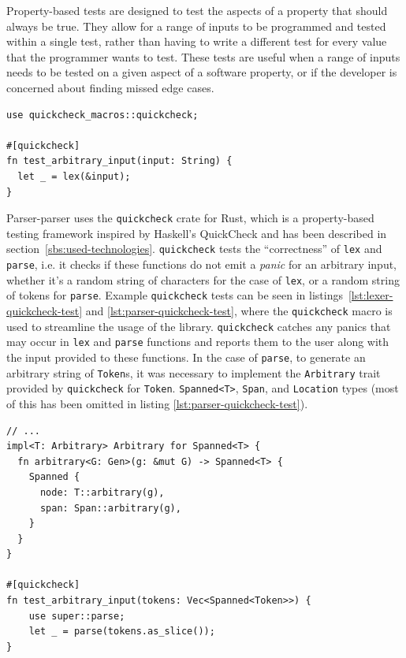 \documentclass[english,engineering]{wizthesis}
\newcommand{\thisproject}{Parser-parser}
\begin{document}
Property-based tests are designed to test the aspects of a property that should
always be true. They allow for a range of inputs to be programmed and tested
within a single test, rather than having to write a different test for every
value that the programmer wants to test. These tests are useful when a range of
inputs needs to be tested on a given aspect of a software property, or if the
developer is concerned about finding missed edge cases.

\begin{listing}[H]
  \begin{verbatim}
use quickcheck_macros::quickcheck;

#[quickcheck]
fn test_arbitrary_input(input: String) {
  let _ = lex(&input);
}
  \end{verbatim}
  \caption{A QuickCheck test testing arbitrary inputs on the lexer.}
  \label{lst:lexer-quickcheck-test}
\end{listing}

\thisproject{} uses the \texttt{quickcheck} crate for Rust, which is a
property-based testing framework inspired by Haskell's QuickCheck and has been
described in section~\ref{sbs:used-technologies}. \texttt{quickcheck} tests the
``correctness'' of \texttt{lex} and \texttt{parse}, i.e. it checks if these
functions do not emit a \emph{panic} for an arbitrary input, whether it's a
random string of characters for the case of \texttt{lex}, or a random string of
tokens for \texttt{parse}. Example \texttt{quickcheck} tests can be seen in
listings~\ref{lst:lexer-quickcheck-test} and \ref{lst:parser-quickcheck-test},
where the \texttt{quickcheck} macro is used to streamline the usage of the
library. \texttt{quickcheck} catches any panics that may occur in \texttt{lex}
and \texttt{parse} functions and reports them to the user along with the input
provided to these functions. In the case of \texttt{parse}, to generate an
arbitrary string of \texttt{Token}s, it was necessary to implement the
\texttt{Arbitrary} trait provided by \texttt{quickcheck} for \texttt{Token}.
\texttt{Spanned<T>}, \texttt{Span}, and \texttt{Location} types (most of this
has been omitted in listing \ref{lst:parser-quickcheck-test}).

\begin{listing}[H]
  \begin{verbatim}
// ...
impl<T: Arbitrary> Arbitrary for Spanned<T> {
  fn arbitrary<G: Gen>(g: &mut G) -> Spanned<T> {
    Spanned {
      node: T::arbitrary(g),
      span: Span::arbitrary(g),
    }
  }
}

#[quickcheck]
fn test_arbitrary_input(tokens: Vec<Spanned<Token>>) {
    use super::parse;
    let _ = parse(tokens.as_slice());
}
  \end{verbatim}
  \caption{A QuickCheck test related to the parser, testing strings of arbitrary
  tokens.}
  \label{lst:parser-quickcheck-test}
\end{listing}
\end{document}
